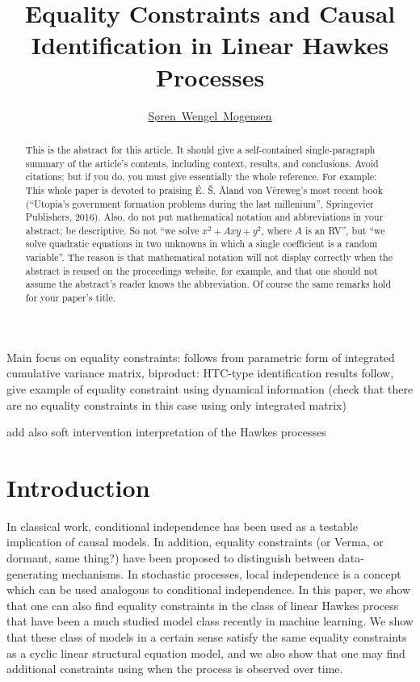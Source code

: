 \documentclass[accepted]{uai2021} %
\title{Equality Constraints and Causal Identification in Linear Hawkes 
Processes}
\author[1]{\href{mailto: Søren Wengel Mogensen 
<swemo@dtu.dk>}{Søren~Wengel~Mogensen}{}}
\affil[1]{%
    Section of Cognitive Systems\\
    Technical University of Denmark\\
    Denmark
}
\begin{document}
\maketitle

\begin{abstract}
  This is the abstract for this article.
  It should give a self-contained single-paragraph summary of the article's contents, including context, results, and conclusions.
  Avoid citations; but if you do, you must give essentially the whole reference.
  For example: This whole paper is devoted to praising É. Š. Åland von Vèreweg's most recent book (“Utopia's government formation problems during the last millenium”, Springevier Publishers, 2016).
  Also, do not put mathematical notation and abbreviations in your abstract; be descriptive.
  So not “we solve \(x^2+A xy+y^2\), where \(A\) is an RV”, but “we solve quadratic equations in two unknowns in which a single coefficient is a random variable”.
  The reason is that mathematical notation will not display correctly when the abstract is reused on the proceedings website, for example, and that one should not assume the abstract's reader knows the abbreviation.
  Of course the same remarks hold for your paper's title.
\end{abstract}

Main focus on equality constraints: follows from parametric form of integrated 
cumulative variance matrix, biproduct: HTC-type identification results follow, 
give example of equality constraint using dynamical information (check that 
there are no equality constraints in this case using only integrated matrix)

add also soft intervention interpretation of the Hawkes processes

\section{Introduction}\label{sec:intro}

In classical work, conditional independence has been used as a testable 
implication of causal models. In addition, equality constraints (or Verma, or 
dormant, same thing?) have been proposed to distinguish between data-generating 
mechanisms. In stochastic processes, local independence is a concept which can 
be used analogous to conditional independence. In this paper, we show that one 
can also find equality constraints in the class of linear Hawkes process that 
have been a much studied model class recently in machine learning. We show that 
these class of models in a certain sense satisfy the same equality constraints 
as a cyclic linear structural equation model, and we also show that one may 
find additional constraints using when the process is observed over time.
\end{document}
